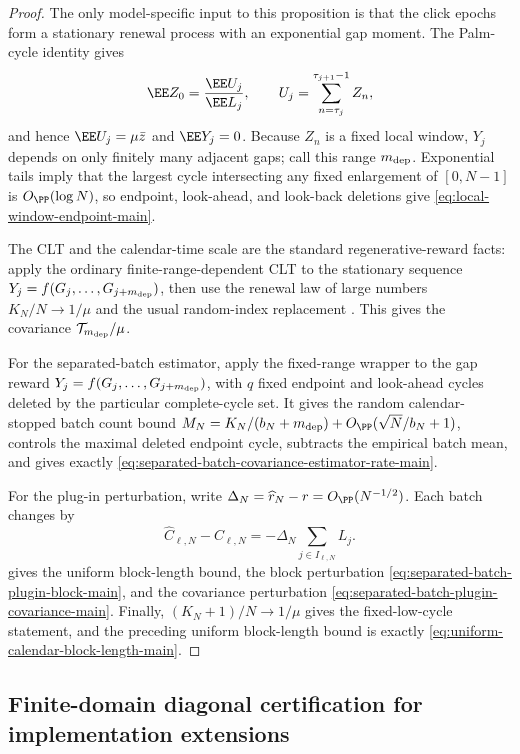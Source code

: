 \begin{proof}
The only model-specific input to this proposition is that the click epochs
form a stationary renewal process with an exponential gap moment.  The
Palm-cycle identity gives
\[
\EE Z_0=\frac{\EE U_j}{\EE L_j},\qquad
U_j=\sum_{n=\tau_j}^{\tau_{j+1}-1}Z_n,
\]
and hence \(\EE U_j=\mu\bar z\) and \(\EE Y_j=0\).  Because \(Z_n\) is a fixed
local window, \(Y_j\) depends on only finitely many adjacent gaps; call this
range \(m_{\rm dep}\).  Exponential tails imply that the largest cycle
intersecting any fixed enlargement of \([0,N-1]\) is \(O_{\PP}(\log N)\), so
endpoint, look-ahead, and look-back deletions give
\eqref{eq:local-window-endpoint-main}.

The CLT and the calendar-time scale are the standard regenerative-reward
facts: apply the ordinary finite-range-dependent CLT to the stationary
sequence \(Y_j=f(G_j,\ldots,G_{j+m_{\rm dep}})\), then use the renewal law of
large numbers \(K_N/N\to1/\mu\) and the usual random-index replacement
\cite[Chs.~IV.3 and VI.3]{AsmussenGlynn2007}.  This gives the covariance
\(\mathcal T_{m_{\rm dep}}/\mu\).

For the separated-batch estimator, apply the fixed-range wrapper
 to the gap reward
\(Y_j=f(G_j,\ldots,G_{j+m_{\rm dep}})\), with \(q\) fixed endpoint and
look-ahead cycles deleted by the particular complete-cycle set.  It gives the
random calendar-stopped batch count bound
\(M_N=K_N/(b_N+m_{\rm dep})+O_{\PP}(\sqrt N/b_N+1)\), controls the maximal
deleted endpoint cycle, subtracts the empirical batch mean, and gives exactly
\eqref{eq:separated-batch-covariance-estimator-rate-main}.

For the plug-in perturbation, write
\(\Delta_N=\widehat r_N-r=O_{\PP}(N^{-1/2})\).  Each batch changes by
\[
\widehat C_{\ell,N}-C_{\ell,N}
=-\Delta_N\sum_{j\in I_{\ell,N}}L_j .
\]
 gives the uniform
block-length bound, the block perturbation
\eqref{eq:separated-batch-plugin-block-main}, and the covariance perturbation
\eqref{eq:separated-batch-plugin-covariance-main}.  Finally,
\((K_N+1)/N\to1/\mu\) gives the fixed-low-cycle statement, and the preceding
uniform block-length bound is exactly \eqref{eq:uniform-calendar-block-length-main}.
\end{proof}

\ifdefined\SUPPLEMENTARYFULLPROTOCOLS
\subsection{Finite-domain diagonal certification for implementation extensions}
\label{app:finite-domain-diagonal-certification-main}

